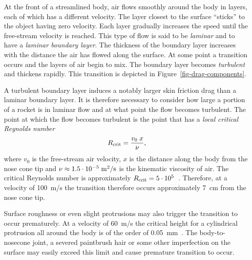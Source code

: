 At the front of a streamlined body, air flows smoothly around the
body in layers, each of which has a different velocity.  The layer
closest to the surface ``sticks'' to the object having zero velocity.
Each layer gradually increases the speed until the free-stream
velocity is reached.  This type of flow is said to be {\it laminar}
and to have a {\it laminar boundary layer}.  The thickness of the
boundary layer increases with the distance the air has flowed along
the surface.  At some point a transition occurs and the layers of air
begin to mix.  The boundary layer becomes {\it turbulent} and thickens
rapidly.  This transition is depicted in
Figure~\ref{fig-drag-components}.

A turbulent boundary layer induces a notably larger skin friction drag
than a laminar boundary layer.  It is therefore necessary to consider
how large a portion of a rocket is in laminar flow and at what point
the flow becomes turbulent.  The point at which the flow becomes
turbulent is the point that has a {\it local critical Reynolds number}
%
\begin{equation}
R_{\rm crit} = \frac{v_0 \; x}{\nu},
\label{eq-transition-Re}
\end{equation}
%
where $v_0$ is the free-stream air velocity, $x$ is the distance along
the body from the nose cone tip and 
$\nu\approx 1.5\cdot10^{-5}\;\rm m^2/s$ is the kinematic viscosity of
air.  The critical Reynolds number is approximately 
$R_{\rm crit} = 5\cdot10^5$~\cite[p.~43]{barrowman-thesis}. Therefore,
at a velocity of 100~m/s the transition therefore occurs approximately
7~cm from the nose cone tip.




Surface roughness or even slight protrusions may also trigger the
transition to occur prematurely.  At a velocity of 60~m/s the critical
height for a cylindrical protrusion all around the body is of the
order of 0.05~mm~\cite[p.~348]{advanced-model-rocketry}.  The
body-to-nosecone joint, a severed paintbrush hair or some other
imperfection on the surface may easily exceed this limit and cause
premature transition to occur.


